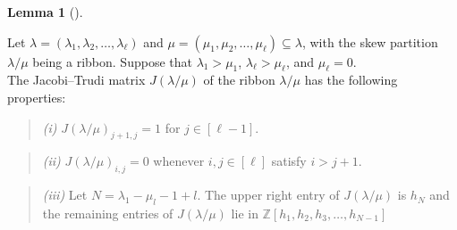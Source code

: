 \documentclass[numbers=enddot,12pt,final,onecolumn,notitlepage]{scrartcl}%
\theoremstyle{definition}
\newtheorem{lem}[theo]{Lemma}
\newenvironment{lemma}[1][]
{\begin{lem}[#1]\begin{leftbar}}
{\end{leftbar}\end{lem}}
\newtheorem{defi}[theo]{Definition}
\newenvironment{definition}[1][]
{\begin{defi}[#1]\begin{leftbar}}
{\end{leftbar}\end{defi}}
\newtheorem{exam}[theo]{Example}
\newenvironment{example}[1][]
{\begin{exam}[#1]\begin{leftbar}}
{\end{leftbar}\end{exam}}
\newenvironment{statement}{\begin{quote}}{\end{quote}}
\renewcommand{\leq}{\leqslant}
\theoremstyle{plainsl}
\begin{document}







\begin{lemma}
\label{lemma.Hessenberg}




















Let $\lambda= (\lambda_1, \lambda_2, \ldots, \lambda_{\ell})$  and $\mu= (\mu_1, \mu_2, \ldots, \mu_{\ell}) \subseteq \lambda$, with the skew partition $\lambda/\mu$ being a ribbon. 
Suppose that $\lambda_1> \mu_1$, $\lambda_\ell> \mu_\ell$, and $\mu_{\ell}=0$.\\
 
The Jacobi--Trudi matrix $J(\lambda/\mu)$ of the ribbon $\lambda/\mu$ has the following properties:

\begin{statement}
\textit{(i)} $J(\lambda/\mu)_{j+1,j}=1$ for $j \in [\ell-1].$
\end{statement}
 
\begin{statement}
\textit{(ii)} $J(\lambda/\mu)_{i,j}=0$ whenever
$i, j \in [\ell]$ satisfy $i > j+1$.
\end{statement}

\begin{statement}
\textit{(iii)} Let $N= \lambda_1 -\mu_l-1+l$. The upper right entry of $J(\lambda/\mu)$ is $h_N$ and the remaining entries of $J(\lambda/\mu)$ lie in $\mathbb{Z}\left[  h_{1},h_{2}%
,h_{3},\ldots, h_{N-1}\right]$
\end{statement}
\end{lemma}
\end{document}

